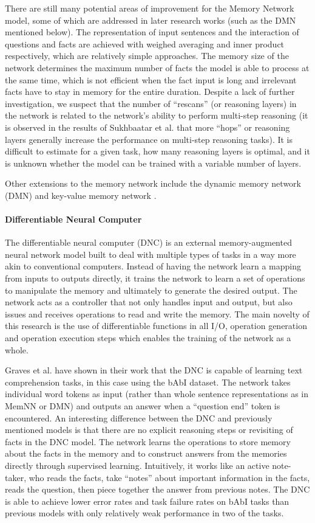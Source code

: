 \documentclass[]{article}
\begin{document}
There are still many potential areas of improvement for the Memory Network model, some of which are addressed in later research works (such as the DMN mentioned below). The representation of input sentences and the interaction of questions and facts are achieved with weighed averaging and inner product respectively, which are relatively simple approaches. The memory size of the network determines the maximum number of facts the model is able to process at the same time, which is not efficient when the fact input is long and irrelevant facts have to stay in memory for the entire duration. Despite a lack of further investigation, we suspect that the number of “rescans” (or reasoning layers) in the network is related to the network’s ability to perform multi-step reasoning (it is observed in the results of Sukhbaatar et al. that more “hops” or reasoning layers generally increase the performance on multi-step reasoning tasks). It is difficult to estimate for a given task, how many reasoning layers is optimal, and it is unknown whether the model can be trained with a variable number of layers.

Other extensions to the memory network include the dynamic memory network (DMN) \cite{kumar2016ask} and key-value memory network \cite{miller2016key}.

\paragraph{Differentiable Neural Computer}
The differentiable neural computer (DNC) \cite{graves2016hybrid} is an external memory-augmented neural network model built to deal with multiple types of tasks in a way more akin to conventional computers. Instead of having the network learn a mapping from inputs to outputs directly, it trains the network to learn a set of operations to manipulate the memory and ultimately to generate the desired output. The network acts as a controller that not only handles input and output, but also issues and receives operations to read and write the memory. The main novelty of this research is the use of differentiable functions in all I/O, operation generation and operation execution steps which enables the training of the network as a whole. 

Graves et al. \cite{graves2016hybrid} have shown in their work that the DNC is capable of learning text comprehension tasks, in this case using the bAbI dataset. The network takes individual word tokens as input (rather than whole sentence representations as in MemNN or DMN) and outputs an answer when a “question end” token is encountered.  An interesting difference between the DNC and previously mentioned models is that there are no explicit reasoning steps or revisiting of facts in the DNC model. The network learns the operations to store memory about the facts in the memory and to construct answers from the memories directly through supervised learning. Intuitively, it works like an active note-taker, who reads the facts, take “notes” about important information in the facts, reads the question, then piece together the answer from previous notes. The DNC is able to achieve lower error rates and task failure rates on bAbI tasks than previous models with only relatively weak performance in two of the tasks.
\end{document}
